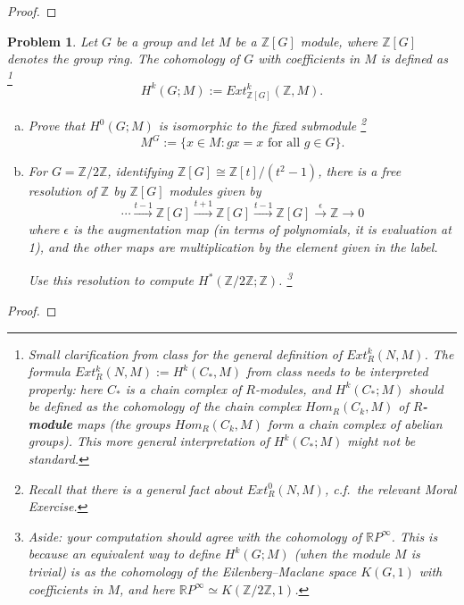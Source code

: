 \documentclass[11pt]{article}
\newtheorem{problem}{Problem}
\begin{document}
\begin{proof}

\end{proof}

\pagebreak 

\begin{problem}
Let $G$ be a group and let $M$ be a $\mathbb Z[G]$ module, where $\mathbb Z[G]$ denotes the group ring. The cohomology of $G$ with coefficients in $M$ is defined as \footnote{Small clarification from class for the general definition of $Ext^k_R(N,M)$. The formula $Ext^k_{R}(N,M):=H^k(C_*,M)$ from class needs to be interpreted properly: here $C_*$ is a chain complex of $R$-modules, and $H^k(C_*;M)$ should be defined as the cohomology of the chain complex $Hom_R(C_k,M)$ of {\bf \boldmath $R$-module} maps (the groups $Hom_R(C_k,M)$ form a chain complex of abelian groups). This more general interpretation of $H^k(C_*;M)$ might not be standard.} 
\[H^k(G;M):=Ext^k_{\mathbb Z[G]}(\mathbb Z,M). \]
\begin{enumerate}[(a)]
\item Prove that $H^0(G;M)$ is isomorphic to the fixed submodule \footnote{Recall that there is a general fact about $Ext^0_R(N,M)$, c.f.\ the relevant Moral Exercise.}
\[M^G:=\{x\in M: gx=x\text{ for all }g\in G\}.\]
\item For $G=\mathbb Z/2\mathbb Z$, identifying $\mathbb Z[G]\cong\mathbb Z[t]/(t^2-1)$, there is a free resolution of $\mathbb Z$ by $\mathbb Z[G]$ modules given by
\[
\cdots\xrightarrow{t-1}\mathbb Z[G]\xrightarrow{t+1}\mathbb Z[G]\xrightarrow{t-1}\mathbb Z[G]\xrightarrow{\epsilon}\mathbb Z\to0\]
where $\epsilon$ is the augmentation map (in terms of polynomials, it is evaluation at 1), and the other maps are multiplication by the element given in the label. 

Use this resolution to compute $H^*(\mathbb Z/2\mathbb Z;\mathbb Z)$. \footnote{Aside: your computation should agree with the cohomology of $\mathbb RP^\infty$. This is because an equivalent way to define $H^k(G;M)$ (when the module $M$ is trivial) is as the cohomology of the Eilenberg--Maclane space $K(G,1)$ with coefficients in $M$, and here $\mathbb RP^\infty\simeq K(\mathbb Z/2\mathbb Z,1)$. }


\end{enumerate} 
\end{problem}

\begin{proof}

\end{proof}
\end{document}
